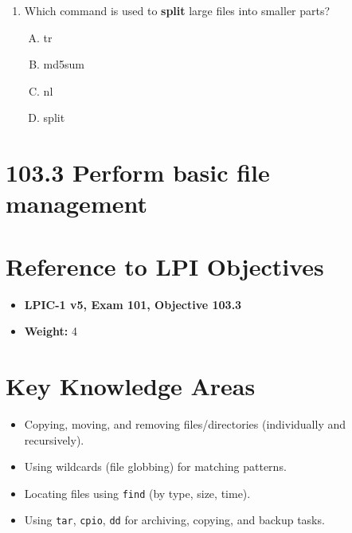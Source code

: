 \documentclass[a4paper]{report}
\begin{document}
\begin{enumerate}[1.]
    \item Which command is used to \textbf{split} large files into smaller parts?  
    \begin{enumerate}[A)]
        \item tr  
        \item md5sum  
        \item nl  
        \item split  
    \end{enumerate}

\end{enumerate}


\newpage
\section*{103.3 Perform basic file management}

\section*{Reference to LPI Objectives}
\begin{itemize}
    \item \textbf{LPIC-1 v5, Exam 101, Objective 103.3}
    \item \textbf{Weight:} 4
\end{itemize}

\section*{Key Knowledge Areas}
\begin{itemize}
    \item Copying, moving, and removing files/directories (individually and recursively).
    \item Using wildcards (file globbing) for matching patterns.
    \item Locating files using \texttt{find} (by type, size, time).
    \item Using \texttt{tar}, \texttt{cpio}, \texttt{dd} for archiving, copying, and backup tasks.
\end{itemize}
\end{document}
